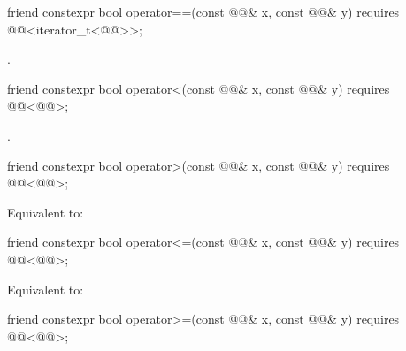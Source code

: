 %
\begin{itemdecl}
friend constexpr bool operator==(const @@& x, const @@& y)
      requires @@<iterator_t<@@>>;
\end{itemdecl}

\begin{itemdescr}
\pnum
\returns
{}.
\end{itemdescr}

%
\begin{itemdecl}
friend constexpr bool operator<(const @@& x, const @@& y)
  requires @@<@@>;
\end{itemdecl}

\begin{itemdescr}
\pnum
\returns
{}.
\end{itemdescr}

%
\begin{itemdecl}
friend constexpr bool operator>(const @@& x, const @@& y)
  requires @@<@@>;
\end{itemdecl}

\begin{itemdescr}
\pnum
\effects
Equivalent to: 
\end{itemdescr}

%
\begin{itemdecl}
friend constexpr bool operator<=(const @@& x, const @@& y)
  requires @@<@@>;
\end{itemdecl}

\begin{itemdescr}
\pnum
\effects
Equivalent to: 
\end{itemdescr}

%
\begin{itemdecl}
friend constexpr bool operator>=(const @@& x, const @@& y)
  requires @@<@@>;
\end{itemdecl}

